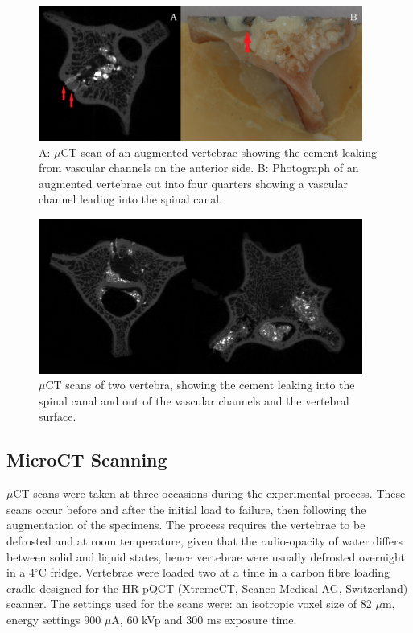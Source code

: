 \begin{figure}[ht!]
\centering
\includegraphics[width=4.18472in]{images/cementleakage.png}
\caption{A: $\mu$CT scan of an augmented vertebrae showing the cement leaking from vascular channels on the anterior side. B: Photograph of an augmented vertebrae cut into four quarters showing a vascular channel leading into the spinal canal.}
\label{fig:cementleakage}
\end{figure}

\begin{figure}[ht!]
\centering
\includegraphics[width=4.18472in]{images/bigLeakage_noBluTac.png}
\caption{$\mu$CT scans of two vertebra, showing the cement leaking into the spinal canal and out of the vascular channels and the vertebral surface.}
\label{fig:2vertWithoutBluTac}
\end{figure}


\subsection{MicroCT Scanning}

$\mu$CT scans were taken at three occasions during the experimental process. These scans occur before and after the initial load to failure, then following the augmentation of the specimens. The process requires the vertebrae to be defrosted and at room temperature, given that the radio-opacity of water differs between solid and liquid states, hence vertebrae were usually defrosted overnight in a 4$^\circ$C fridge. Vertebrae were loaded two at a time in a carbon fibre loading cradle designed for the HR-pQCT (XtremeCT, Scanco Medical AG, Switzerland) scanner. The settings used for the scans were: an isotropic voxel size of 82 $\mu$m, energy settings 900 $\mu$A, 60 kVp and 300 ms exposure time.


